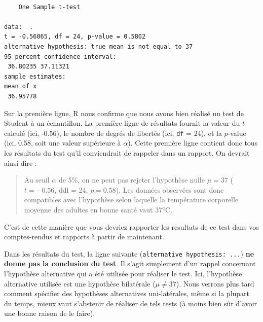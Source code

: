 \documentclass[a4paperpaper,]{article}
\begin{document}
\begin{verbatim}

    One Sample t-test

data:  .
t = -0.56065, df = 24, p-value = 0.5802
alternative hypothesis: true mean is not equal to 37
95 percent confidence interval:
 36.80235 37.11321
sample estimates:
mean of x 
 36.95778 
\end{verbatim}

Sur la première ligne, R nous confirme que nous avons bien réalisé un test de Student à un échantillon. La première ligne de résultats fournit la valeur du \(t\) calculé (ici, -0.56), le nombre de degrés de libertés (ici, \texttt{df} = 24), et la \(p\)-value (ici, 0.58, soit une valeur supérieure à \(\alpha\)). Cette première ligne contient donc tous les résultats du test qu'il conviendrait de rappeler dans un rapport. On devrait ainsi dire :

\begin{quote}
Au seuil \(\alpha\) de 5\%, on ne peut pas rejeter l'hypothèse nulle \(\mu = 37\) (\(t = -0.56\), ddl = 24, \(p = 0.58\)). Les données observées sont donc compatibles avec l'hypothèse selon laquelle la température corporelle moyenne des adultes en bonne santé vaut 37ºC.
\end{quote}

C'est de cette manière que vous devriez rapporter les resultats de ce test dans vos comptes-rendus et rapports à partir de maintenant.

Dans les résultats du test, la ligne suivante (\texttt{alternative\ hypothesis:\ ...}) \textbf{ne donne pas la conclusion du test}. Il s'agit simplement d'un rappel concernant l'hypothèse alternative qui a été utilisée pour réaliser le test. Ici, l'hypothèse alternative utilisée est une hypothèse bilatérale (\(\mu \neq 37\)). Nous verrons plus tard comment spécifier des hypothèses alternatives uni-latérales, même si la plupart du temps, mieux vaut s'abstenir de réaliser de tels tests (à moins bien sûr d'avoir une bonne raison de le faire).
\end{document}
